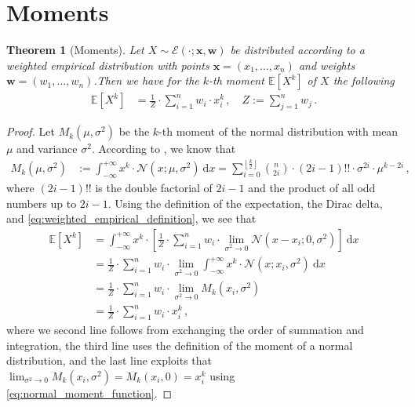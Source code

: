 \documentclass[a4paper]{article}
\newcommand{\Normal}[3]{{\mathcal N} \left({#1};{#2},{#3}\right)}
\newcommand{\NormalMoment}[3]{M_{#1} \left({#2},{#3}\right)}
\newcommand{\WeightedEmpirical}[3]{{\mathcal E} \left({#1};{#2},{#3}\right)}
\newcommand{\expect}[1]{{\mathbb E \left[ {#1} \right]}}
\newcommand{\intd}[1]{\ \mathrm{d}{#1}}
\newcommand{\bs}[1]{\boldsymbol{#1}}
\newtheorem{theorem}{Theorem}
\theoremstyle{definition}
\begin{document}
\section*{Moments}
\begin{theorem}[Moments] Let $X \sim \WeightedEmpirical{\cdot}{\bs{x}}{\bs{w}}$ be distributed according to a weighted empirical distribution with points $\bs{x} = \left(x_1,\ldots,x_n\right)$ and weights $\bs{w} = \left(w_1,\ldots,w_n\right)$.Then we have for the $k$-th moment $\expect{X^k}$ of $X$ the following
    \begin{align}
        \expect{X^k} & = \frac{1}{Z} \cdot \sum_{i=1}^n w_i \cdot x_i^k \,, \quad Z := \sum_{j=1}^n w_j \,.
    \end{align}
\end{theorem}
\begin{proof} Let $\NormalMoment{k}{\mu}{\sigma^2}$ be the $k$-th moment of the normal distribution with mean $\mu$ and variance $\sigma^2$. According to \cite{Win2012a}, we know that
    \begin{align}
        \NormalMoment{k}{\mu}{\sigma^2} & := \int_{-\infty}^{+\infty} x^k \cdot \Normal{x}{\mu}{\sigma^2} \intd{x} = \sum_{i=0}^{\left\lfloor \frac{k}{2} \right\rfloor} {n \choose 2i} \cdot \left(2i - 1\right)!! \cdot \sigma^{2i} \cdot \mu^{k-2i} \label{eq:normal_moment_function} \,,
    \end{align} 
    where $\left(2i - 1\right)!!$ is the double factorial of $2i - 1$ and the product of all odd numbers up to $2i - 1$. Using the definition of the expectation, the Dirac delta, and \eqref{eq:weighted_empirical_definition}, we see that
    \begin{align*}
        \expect{X^k} & =  \int_{-\infty}^{+\infty} x^k \cdot \left[ \frac{1}{Z} \cdot \sum_{i=1}^n w_i \cdot \lim_{\sigma^2 \rightarrow 0} \Normal{x - x_i}{0}{\sigma^2} \right] \intd{x}  \\
        & =  \frac{1}{Z} \cdot \sum_{i=1}^n w_i \cdot \lim_{\sigma^2 \rightarrow 0} \int_{-\infty}^{+\infty} x^k \cdot \Normal{x}{x_i}{\sigma^2} \intd{x}  \\
        & =  \frac{1}{Z} \cdot \sum_{i=1}^n w_i \cdot \lim_{\sigma^2 \rightarrow 0} \NormalMoment{k}{x_i}{\sigma^2}  \\
        & =  \frac{1}{Z} \cdot \sum_{i=1}^n w_i \cdot x_i^k \,,
    \end{align*}
    where we second line follows from exchanging the order of summation and integration, the third line uses the definition of the moment of a normal distribution, and the last line exploits that $\lim_{\sigma^2 \rightarrow 0} \NormalMoment{k}{x_i}{\sigma^2} = \NormalMoment{k}{x_i}{0} = x_i^k$ using \eqref{eq:normal_moment_function}.
\end{proof}



\end{document}
